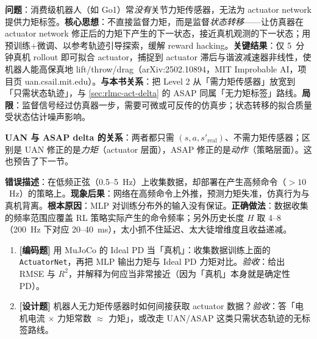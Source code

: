 \begin{paper}\label{paper:rlmc-act-uan}
\textbf{问题}：消费级机器人（如 Go1）常\emph{没有}关节力矩传感器，无法为 actuator network 提供力矩标签。\textbf{核心思想}：不直接监督力矩，而是监督\emph{状态转移}——让仿真器在 actuator network 修正后的力矩下产生的下一状态，接近真机观测的下一状态；用预训练$+$微调、以参考轨迹引导探索，缓解 reward hacking。\textbf{关键结果}：仅 5~分钟真机 rollout 即可拟合 actuator，捕捉到 actuator 滞后与谐波减速器非线性，使机器人能高保真地 lift/throw/drag（arXiv:2502.10894，MIT Improbable AI，项目页 uan.csail.mit.edu）\cite{fey2025uan}。\textbf{与本书关系}：把 Level 2 从「需力矩传感器」放宽到「只需状态轨迹」，与 \cref{sec:rlmc-act-delta} 的 ASAP 同属「无力矩标签」路线。\textbf{局限}：监督信号经过仿真器一步，需要可微或可反传的仿真步；状态转移的拟合质量受状态估计噪声影响。
\end{paper}

\textbf{UAN 与 ASAP delta 的关系}：两者都只需 $(s,a,s'_{\text{real}})$、不需力矩传感器；区别是 UAN 修正的是\emph{力矩}（actuator 层面），ASAP 修正的是\emph{动作}（策略层面）。这也预告了下一节。

\begin{pitfall}[训练数据与部署数据的频率分布不匹配]
\textbf{错误描述}：在低频正弦（0.5--5~Hz）上收集数据，却部署在产生高频命令（$>10$~Hz）的策略上。\textbf{现象后果}：网络在高频命令上外推，预测力矩失准，仿真行为与真机背离。\textbf{根本原因}：MLP 对训练分布外的输入没有保证。\textbf{正确做法}：数据收集的频率范围应覆盖 RL 策略实际产生的命令频率；另外历史长度 $H$ 取 4--8（200~Hz 下对应 20--40~ms），太小抓不住延迟、太大徒增维度且收益递减。
\end{pitfall}

\begin{practice}[本节练习]
\begin{enumerate}
  \item \textbf{[编码题]} 用 MuJoCo 的 Ideal PD 当「真机」：收集数据训练上面的 \verb|ActuatorNet|，再把 MLP 输出力矩与 Ideal PD 力矩对比。\emph{验收}：给出 RMSE 与 $R^2$，并解释为何应当非常接近（因为「真机」本身就是确定性 PD）。
  \item \textbf{[设计题]} 机器人无力矩传感器时如何间接获取 actuator 数据？\emph{验收}：答「电机电流 $\times$ 力矩常数 $\approx$ 力矩」，或改走 UAN/ASAP 这类只需状态轨迹的无标签路线。
\end{enumerate}
\end{practice}


